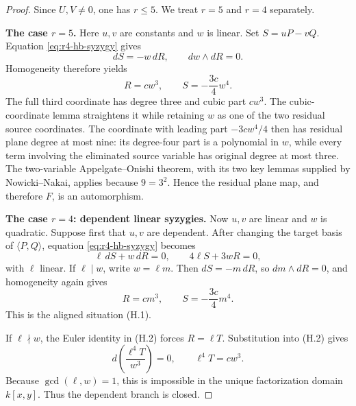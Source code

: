 \begin{proof}
Since \(U,V\ne0\), one has \(r\le5\).  We treat \(r=5\) and
\(r=4\) separately.

\medskip
\noindent
\textbf{The case \(r=5\).}
Here \(u,v\) are constants and \(w\) is linear.  Set
\(S=uP-vQ\).  Equation \eqref{eq:r4-hb-syzygy} gives
\[
 dS=-w\,dR,
 \qquad
 dw\wedge dR=0.
\]
Homogeneity therefore yields
\[
 R=cw^3,
 \qquad
 S=-\frac{3c}{4}w^4.
 \tag{H.1}
\]
The full third coordinate has degree three and cubic part \(cw^3\).
The cubic-coordinate lemma straightens it while retaining \(w\) as one of
the two residual source coordinates.  The coordinate with leading part
\(-3cw^4/4\) then has residual plane degree at most nine: its degree-four
part is a polynomial in \(w\), while every term involving the eliminated
source variable has original degree at most three.  The two-variable
Appelgate--Onishi theorem, with its two key lemmas supplied by
Nowicki--Nakai, applies because \(9=3^2\).  Hence the residual plane map,
and therefore \(F\), is an automorphism.

\medskip
\noindent
\textbf{The case \(r=4\): dependent linear syzygies.}
Now \(u,v\) are linear and \(w\) is quadratic.  Suppose first that
\(u,v\) are dependent.  After changing the target basis of
\(\langle P,Q\rangle\), equation \eqref{eq:r4-hb-syzygy} becomes
\[
 \ell\,dS+w\,dR=0,
 \qquad
 4\ell S+3wR=0,                         \tag{H.2}
\]
with \(\ell\) linear.  If \(\ell\mid w\), write \(w=\ell m\).
Then \(dS=-m\,dR\), so \(dm\wedge dR=0\), and homogeneity again gives
\[
 R=cm^3,
 \qquad
 S=-\frac{3c}{4}m^4.
\]
This is the aligned situation (H.1).

If \(\ell\nmid w\), the Euler identity in (H.2) forces
\(R=\ell T\).  Substitution into (H.2) gives
\[
 d\!\left(\frac{\ell^4T}{w^3}\right)=0,
 \qquad
 \ell^4T=cw^3.
\]
Because \(\gcd(\ell,w)=1\), this is impossible in the unique
factorization domain \(k[x,y]\).  Thus the dependent branch is closed.


\end{proof}
